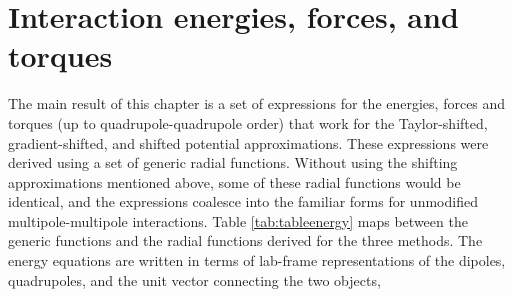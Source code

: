 \section{Interaction energies, forces, and torques}
The main result of this chapter is a set of expressions for the
energies, forces and torques (up to quadrupole-quadrupole order) that
work for the Taylor-shifted, gradient-shifted, and shifted potential
approximations.  These expressions were derived using a set of generic
radial functions.  Without using the shifting approximations mentioned
above, some of these radial functions would be identical, and the
expressions coalesce into the familiar forms for unmodified
multipole-multipole interactions.  Table \ref{tab:tableenergy} maps
between the generic functions and the radial functions derived for the
three methods.  The energy equations are written in terms of lab-frame
representations of the dipoles, quadrupoles, and the unit vector
connecting the two objects,

